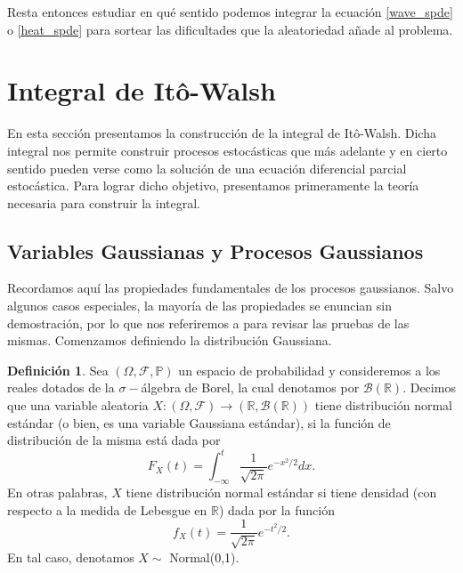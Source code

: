 \documentclass[letterpaper,twoside,12pt]{book}
\newcommand{\R}{\mathbb{R}}
\newcommand{\F}{\mathcal{F}}
\newcommand{\B}{\mathcal{B}}
\renewcommand{\P}{\mathbb{P}}
\newcommand{\1}{\mathds{1}}
\renewcommand{\to}{\rightarrow}
\theoremstyle{definition}
\newtheorem{dfn}{Definición}
\theoremstyle{definition}
\theoremstyle{remark}
\theoremstyle{definition}
\theoremstyle{definition}
\theoremstyle{definition}
\theoremstyle{definition}
\theoremstyle{definition}
\begin{document}
Resta entonces estudiar en qué sentido podemos integrar la ecuación \eqref{wave_spde} o \eqref{heat_spde} para sortear las dificultades que la aleatoriedad añade al problema.


\section{Integral de Itô-Walsh}
En esta sección presentamos la construcción de la integral de Itô-Walsh. Dicha integral nos permite construir procesos estocásticas que más adelante y en cierto sentido pueden verse como la solución de una ecuación diferencial parcial estocástica. Para lograr dicho objetivo, presentamos primeramente la teoría necesaria para construir la integral.
\subsection{Variables Gaussianas y Procesos Gaussianos}
Recordamos aquí las propiedades fundamentales de los procesos gaussianos. Salvo algunos casos especiales, la mayoría de las propiedades se enuncian sin demostración, por lo que nos referiremos a \cite{gall2016brownian} para revisar las pruebas de las mismas. Comenzamos definiendo la distribución Gaussiana.

\begin{dfn}
Sea $(\Omega, \F, \P)$ un espacio de probabilidad y consideremos a los reales dotados de la $\sigma-$álgebra de Borel, la cual denotamos por $\B(\R)$. Decimos que una variable aleatoria $X:(\Omega, \F)\to (\R,\B(\R))$ tiene distribución normal estándar (o bien, es una variable Gaussiana estándar), si la función de distribución de la misma está dada por
\[
F_X(t)=\int_{-\infty}^{t}\frac{1}{\sqrt{2\pi}}e^{-x^2/2}dx.    
\]
En otras palabras, $X$ tiene distribución normal estándar si tiene densidad (con respecto a la medida de Lebesgue en $\R$) dada por la función 
\[
f_X(t)=\frac{1}{\sqrt{2\pi}}e^{-t^2/2}.
\]
En tal caso, denotamos $X\sim$ Normal(0,1).
\end{dfn}
\end{document}
